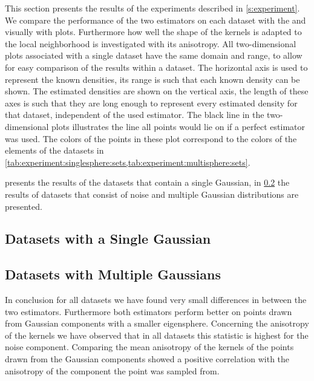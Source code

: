 

This section presents the results of the experiments described in \cref{s:experiment}. 
We compare the performance of the two estimators on each dataset with the \mse and visually with plots. Furthermore how well the shape of the kernels is adapted to the local neighborhood is investigated with its anisotropy.
	All two-dimensional plots associated with a single dataset have the same domain and range, to allow for easy comparison of the results within a dataset. The horizontal axis is used to represent the known densities, its range is such that each known density can be shown. The estimated densities are shown on the vertical axis, the length of these axes is such that they are long enough to represent every estimated density for that dataset, independent of the used estimator. 
	The black line in the two-dimensional plots illustrates the line all points would lie on if a perfect estimator was used.
	The colors of the points in these plot correspond to the colors of the elements of the datasets in \cref{tab:experiment:singlesphere:sets,tab:experiment:multisphere:sets}.

	 presents the results of the datasets that contain a single Gaussian, in \cref{s:results:multipleGaussian} the results of datasets that consist of noise and multiple Gaussian distributions are presented. 

\subsection{Datasets with a Single Gaussian}
\label{s:results:singleGaussian}


\subsection{Datasets with Multiple Gaussians}
\label{s:results:multipleGaussian}


	In conclusion for all datasets we have found very small differences in \mse between the two estimators. 
	Furthermore both estimators perform better on points drawn from Gaussian components with a smaller eigensphere. 
	Concerning the anisotropy of the kernels we have observed that in all datasets this statistic is highest for the noise component. 
	Comparing the mean anisotropy of the kernels of the points drawn from the Gaussian components showed a positive correlation with the anisotropy of the component the point was sampled from. 